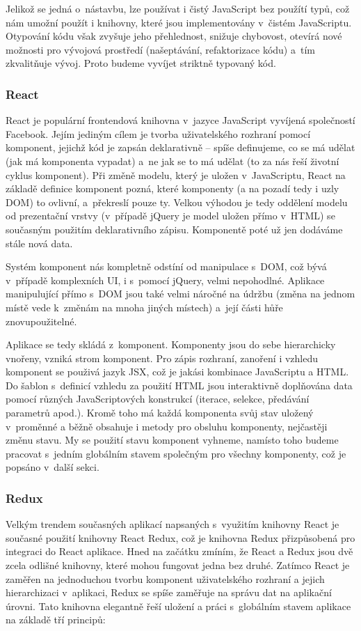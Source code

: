 Jelikož se jedná o~nástavbu, lze používat i čistý JavaScript bez použítí typů, což nám umožní použít i knihovny, které jsou implementovány v~čistém JavaScriptu. Otypování kódu však zvyšuje jeho přehlednost, snižuje chybovost, otevírá nové možnosti pro vývojová prostředí (našeptávání, refaktorizace kódu) a~tím zkvalitňuje vývoj. Proto budeme vyvíjet striktně typovaný kód. 


\subsubsection{React}
React je populární frontendová knihovna v~jazyce JavaScript vyvíjená společností Facebook. Jejím jediným cílem je tvorba uživatelského rozhraní pomocí komponent, jejichž kód je zapsán deklarativně -- spíše definujeme, co se má udělat (jak má komponenta vypadat) a~ne jak se to má udělat (to za nás řeší životní cyklus komponent). Při změně modelu, který je uložen v~JavaScriptu, React na základě definice komponent pozná, které komponenty (a na pozadí tedy i uzly DOM) to ovlivní, a~překreslí pouze ty. Velkou výhodou je tedy oddělení modelu od prezentační vrstvy (v~případě jQuery je model uložen přímo v~HTML) se současným použitím deklarativního zápisu. Komponentě poté už jen dodáváme stále nová data.

Systém komponent nás kompletně odstíní od manipulace s~DOM, což bývá v~případě komplexních UI, i s~pomocí jQuery, velmi nepohodlné. Aplikace manipulující přímo s~DOM jsou také velmi náročné na údržbu (změna na jednom místě vede k~změnám na mnoha jiných místech) a~její části hůře znovupoužitelné.

Aplikace se tedy skládá z~komponent. Komponenty jsou do sebe hierarchicky vnořeny, vzniká strom komponent. Pro zápis rozhraní, zanoření i vzhledu komponent se použivá jazyk JSX, což je jakási kombinace JavaScriptu a HTML. Do šablon s~definicí vzhledu za použití HTML jsou interaktivně doplňována data pomocí různých JavaScriptových konstrukcí (iterace, selekce, předávání parametrů apod.). Kromě toho má každá komponenta svůj stav uložený v~proměnné a běžně obsahuje i metody pro obsluhu komponenty, nejčastěji změnu stavu. My se použití stavu komponent vyhneme, namísto toho budeme pracovat s~jedním globálním stavem společným pro všechny komponenty, což je popsáno v~další sekci.


\subsubsection{Redux}
\label{redux}
Velkým trendem současných aplikací napsaných s~využitím knihovny React je současné použití knihovny React Redux, což je knihovna Redux přizpůsobená pro integraci do React aplikace. Hned na začátku zmíním, že React a Redux jsou dvě zcela odlišné knihovny, které mohou fungovat jedna bez druhé. Zatímco React je zaměřen na jednoduchou tvorbu komponent uživatelského rozhraní a jejich hierarchizaci v~aplikaci, Redux se spíše zaměřuje na správu dat na aplikační úrovni. Tato knihovna elegantně řeší uložení a práci s~globálním stavem aplikace na základě tří principů:

